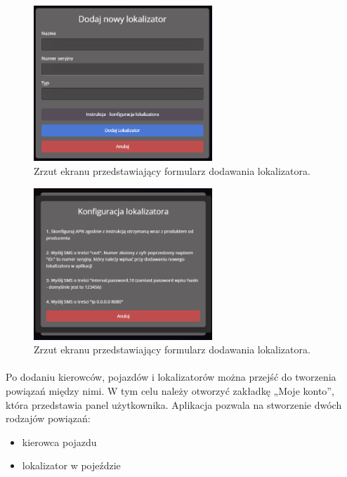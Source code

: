 \begin{figure}
	\centering
	\includegraphics[width=0.6\textwidth]{./graf/add_tracker.png}
	\caption{Zrzut ekranu przedstawiający formularz dodawania lokalizatora.}
	\label{fig:add_tracker}
\end{figure}

\begin{figure}
	\centering
	\includegraphics[width=0.6\textwidth]{./graf/help_dialog.png}
	\caption{Zrzut ekranu przedstawiający formularz dodawania lokalizatora.}
	\label{fig:help_dialog}
\end{figure}

\paragraph{}
Po dodaniu kierowców, pojazdów i lokalizatorów można przejść do tworzenia powiązań między nimi. W tym celu należy otworzyć zakładkę „Moje konto”, która przedstawia panel użytkownika. Aplikacja pozwala na stworzenie dwóch rodzajów powiązań:

\begin{itemize}
	\item kierowca pojazdu
	\item lokalizator w pojeździe
\end{itemize}

